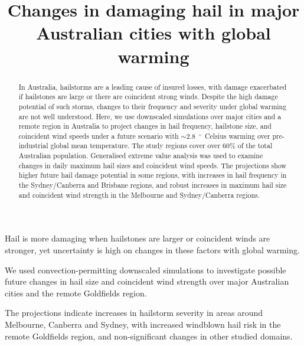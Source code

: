 \documentclass[]{agujournal2019}\usepackage[]{graphicx}\usepackage[]{xcolor}
\begin{document}
\title{Changes in damaging hail in major Australian cities with global warming}




\begin{keypoints}
\item Hail is more damaging when hailstones are larger or coincident winds are stronger, yet uncertainty is high on changes in these factors with global warming.
\item We used convection-permitting downscaled simulations to investigate possible future changes in hail size and coincident wind strength over major Australian cities and the remote Goldfields region.
\item The projections indicate increases in hailstorm severity in areas around Melbourne, Canberra and Sydney, with increased windblown hail risk in the remote Goldfields region, and non-significant changes in other studied domains.
\end{keypoints}

\begin{abstract} %
      In Australia, hailstorms are a leading cause of insured losses, with damage exacerbated if hailstones are large or there are coincident strong winds. Despite the high damage potential of such storms, changes to their frequency and severity under global warming are not well understood. Here, we use downscaled simulations over major cities and a remote region in Australia to project changes in hail frequency, hailstone size, and coincident wind speeds under a future scenario with $\sim$2.8~$^{\circ{}}$~Celsius warming over pre-industrial global mean temperature. The study regions cover over 60\% of the total Australian population. Generalised extreme value analysis was used to examine changes in daily maximum hail sizes and coincident wind speeds. The projections show higher future hail damage potential in some regions, with increases in hail frequency in the Sydney/Canberra and Brisbane regions, and robust increases in maximum hail size and coincident wind strength in the Melbourne and Sydney/Canberra regions.
\end{abstract}
\end{document}
